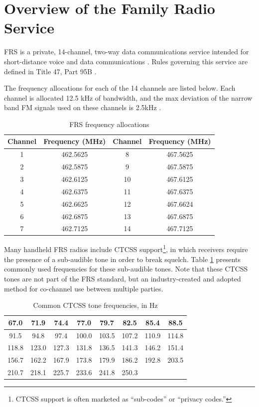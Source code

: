 \section{Overview of the Family Radio Service}

\ac{FRS} is a private, 14-channel, two-way data communications service
intended for short-distance voice and data communications \cite{FCC_FRS}. Rules
governing this service are defined in Title 47, Part 95B \cite{FCC_PART_95B}.

The frequency allocations for each of the 14 channels are listed below. Each
channel is allocated 12.5 kHz of bandwidth, and the max deviation of the
narrow band FM signals used on these channels is 2.5kHz \cite{FCC_PART_95B}.

\begin{table}[h]
  \centering
  \caption{FRS frequency allocations}
  \footnotesize
  \begin{tabular}{|c|c||c|c|}
    \hline
    \textbf{Channel}    & \textbf{Frequency (MHz)} &
    \textbf{Channel}    & \textbf{Frequency (MHz)} \\ \hline
    1 & 462.5625 & 8    & 467.5625 \\ \hline
    2 & 462.5875 & 9    & 467.5875 \\ \hline
    3 & 462.6125 & 10   & 467.6125 \\ \hline
    4 & 462.6375 & 11   & 467.6375 \\ \hline
    5 & 462.6625 & 12   & 467.6624 \\ \hline
    6 & 462.6875 & 13   & 467.6875 \\ \hline
    7 & 462.7125 & 14   & 467.7125 \\ \hline
  \end{tabular}
\end{table}

Many handheld \ac{FRS} radios include \ac{CTCSS} support\footnote{CTCSS support
is often marketed as ``sub-codes'' or ``privacy codes.''}, in which receivers
require the presence of a sub-audible tone in order to break squelch. Table
\ref{tab:ctcss}  presents commonly used frequencies for these sub-audible tones.
Note that these CTCSS tones are not part of the FRS standard, but an
industry-created and adopted method for co-channel use between multiple
parties.

\begin{table}[h]
  \centering
  \caption{Common CTCSS tone frequencies, in Hz} \label{tab:ctcss}
  \footnotesize
  \begin{tabular}{|c|c|c|c|c|c|c|c|}
    \hline
    67.0  & 71.9  & 74.4  & 77.0  & 79.7  &  82.5 &  85.4 & 88.5  \\ \hline
    91.5  & 94.8  & 97.4  & 100.0 & 103.5 & 107.2 & 110.9 & 114.8 \\ \hline
    118.8 & 123.0 & 127.3 & 131.8 & 136.5 & 141.3 & 146.2 & 151.4 \\ \hline
    156.7 & 162.2 & 167.9 & 173.8 & 179.9 & 186.2 & 192.8 & 203.5 \\ \hline
    210.7 & 218.1 & 225.7 & 233.6 & 241.8 & 250.3 &       &       \\ \hline
  \end{tabular}
\end{table}

